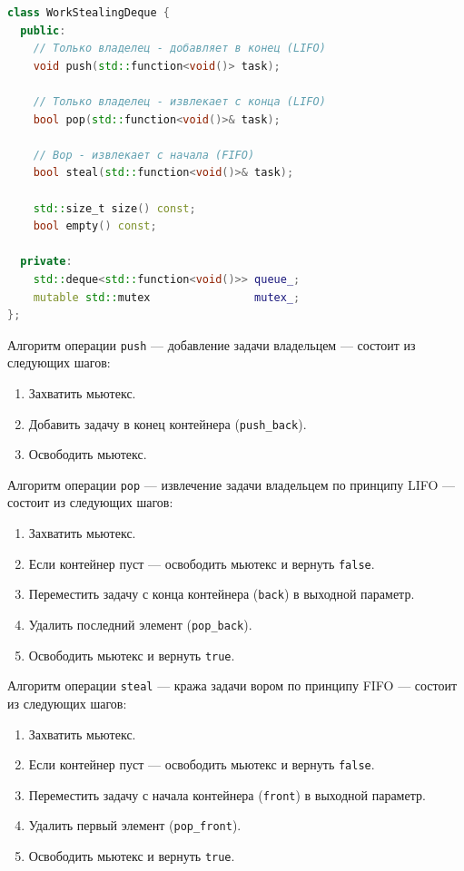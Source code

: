 \begin{lstlisting}[language=C++,
                   caption={Структура WorkStealingDeque},
                   label={lst:deque-struct}]
class WorkStealingDeque {
  public:
    // Только владелец - добавляет в конец (LIFO)
    void push(std::function<void()> task);

    // Только владелец - извлекает с конца (LIFO)
    bool pop(std::function<void()>& task);

    // Вор - извлекает с начала (FIFO)
    bool steal(std::function<void()>& task);

    std::size_t size() const;
    bool empty() const;

  private:
    std::deque<std::function<void()>> queue_;
    mutable std::mutex                mutex_;
};
\end{lstlisting}

Алгоритм операции \texttt{push} --- добавление задачи владельцем
--- состоит из следующих шагов:

\begin{enumerate}
    \item Захватить мьютекс.
    \item Добавить задачу в конец контейнера
          (\texttt{push\_back}).
    \item Освободить мьютекс.
\end{enumerate}

Алгоритм операции \texttt{pop} --- извлечение задачи владельцем
по принципу LIFO --- состоит из следующих шагов:

\begin{enumerate}
    \item Захватить мьютекс.
    \item Если контейнер пуст --- освободить мьютекс
          и вернуть \texttt{false}.
    \item Переместить задачу с конца контейнера
          (\texttt{back}) в выходной параметр.
    \item Удалить последний элемент (\texttt{pop\_back}).
    \item Освободить мьютекс и вернуть \texttt{true}.
\end{enumerate}

Алгоритм операции \texttt{steal} --- кража задачи вором
по принципу FIFO --- состоит из следующих шагов:

\begin{enumerate}
    \item Захватить мьютекс.
    \item Если контейнер пуст --- освободить мьютекс
          и вернуть \texttt{false}.
    \item Переместить задачу с начала контейнера
          (\texttt{front}) в выходной параметр.
    \item Удалить первый элемент (\texttt{pop\_front}).
    \item Освободить мьютекс и вернуть \texttt{true}.
\end{enumerate}

